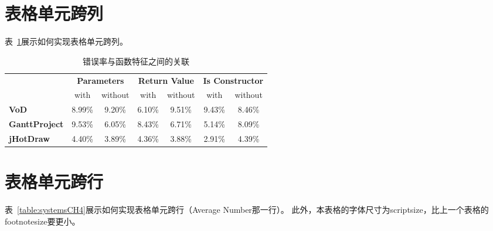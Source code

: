 \section{表格单元跨列}

表~\ref{table:codeSmellMethods}展示如何实现表格单元跨列。

\begin{table}[htb]
	\footnotesize
	\centering
	\caption{错误率与函数特征之间的关联}
	\label{table:codeSmellMethods}
	\vspace{2mm}
	\begin{tabular}{lcccccc}
		\toprule
		& \multicolumn{2}{c}{\textbf{Parameters}}
		& \multicolumn{2}{c}{\textbf{Return Value}}
		& \multicolumn{2}{c}{\textbf{Is Constructor}} \\
		& with & without & with & without & with & without \\
		\midrule
		\textbf{VoD} & 8.99\% & 9.20\% & 6.10\% & 9.51\% & 9.43\% & 8.46\% \\
		\textbf{GanttProject} & 9.53\% & 6.05\% & 8.43\% & 6.71\% & 5.14\% & 8.09\% \\
		\textbf{jHotDraw} & 4.40\% & 3.89\% & 4.36\% & 3.88\% & 2.91\% & 4.39\% \\
		\bottomrule
	\end{tabular}
\end{table}

\section{表格单元跨行}

表~\ref{table:systemsCH4}展示如何实现表格单元跨行（Average Number那一行）。
此外，本表格的字体尺寸为scriptsize，比上一个表格的footnotesize要更小。


